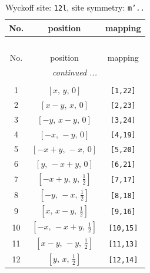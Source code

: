 \documentclass[fleqn,8pt]{jsarticle}
\begin{document}
\begin{longtable}{ccc}
\caption{Wyckoff site: {\tt 12l}, site symmetry: {\tt m'..}}
 \\
 \hline \hline
No. & position & mapping \\ \hline \endfirsthead

\multicolumn{2}{l}{\tablename\ \thetable{}} \\
 \hline \hline
No. & position & mapping \\ \hline \endhead

 \hline \hline
\multicolumn{2}{r}{\footnotesize\it continued ...} \\ \endfoot

 \hline \hline
\multicolumn{2}{r}{} \\ \endlastfoot

1 & $\left[ x,\, y,\, 0 \right]$ & {\tt [1,22]} \\ \hline
2 & $\left[ x - y,\, x,\, 0 \right]$ & {\tt [2,23]} \\ \hline
3 & $\left[ - y,\, x - y,\, 0 \right]$ & {\tt [3,24]} \\ \hline
4 & $\left[ - x,\, - y,\, 0 \right]$ & {\tt [4,19]} \\ \hline
5 & $\left[ - x + y,\, - x,\, 0 \right]$ & {\tt [5,20]} \\ \hline
6 & $\left[ y,\, - x + y,\, 0 \right]$ & {\tt [6,21]} \\ \hline
7 & $\left[ - x + y,\, y,\, \frac{1}{2} \right]$ & {\tt [7,17]} \\ \hline
8 & $\left[ - y,\, - x,\, \frac{1}{2} \right]$ & {\tt [8,18]} \\ \hline
9 & $\left[ x,\, x - y,\, \frac{1}{2} \right]$ & {\tt [9,16]} \\ \hline
10 & $\left[ - x,\, - x + y,\, \frac{1}{2} \right]$ & {\tt [10,15]} \\ \hline
11 & $\left[ x - y,\, - y,\, \frac{1}{2} \right]$ & {\tt [11,13]} \\ \hline
12 & $\left[ y,\, x,\, \frac{1}{2} \right]$ & {\tt [12,14]} \\
\end{longtable}
\renewcommand{\arraystretch}{1.2}
\end{document}
